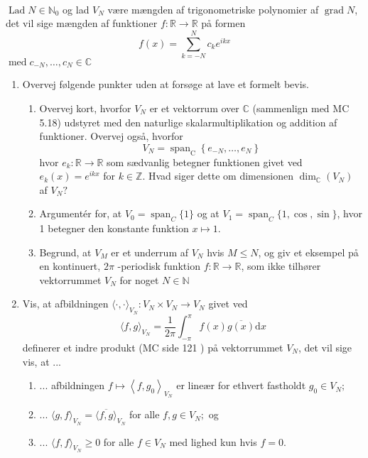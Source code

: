 \begin{itemize}
\begin{opg}[Vektorrumsstruktur]\hfill \\
	$\operatorname{Lad} N \in \mathbb{N}_{0}$ og lad $V_{N}$ være mængden af trigonometriske polynomier af $\operatorname{grad} N$, det vil sige mængden af funktioner $f: \mathbb{R} \rightarrow \mathbb{R}$ på formen
	$$
	f(x)=\sum_{k=-N}^{N} c_{k} e^{i k x}
	$$
	$\operatorname{med} c_{-N}, \ldots, c_{N} \in \mathbb{C}$
	\begin{enumerate}
	 \item Overvej følgende punkter uden at forsøge at lave et formelt bevis.
	 \begin{enumerate}[label=\roman*)]
	\item Overvej kort, hvorfor $V_{N}$ er et vektorrum over $\mathbb{C}$ (sammenlign med MC 5.18) udstyret med den naturlige skalarmultiplikation og addition af funktioner. Overvej også, hvorfor
	$$
	V_{N}=\operatorname{span}_{\mathrm{C}}\left\{e_{-N}, \ldots, e_{N}\right\}
	$$
	hvor $e_{k}: \mathbb{R} \rightarrow \mathbb{R}$ som sædvanlig betegner funktionen givet ved $e_{k}(x)=e^{i k x}$ for $k \in \mathbb{Z} .$ Hvad siger dette om dimensionen $\operatorname{dim}_{\mathbb{C}}\left(V_{N}\right)$ af $V_{N} ?$
	\item Argumentér for, at $V_{0}=\operatorname{span}_{C}\{1\}$ og at $V_{1}=\operatorname{span}_{C}\{1, \cos , \sin \}$, hvor 1 betegner den konstante funktion $x \mapsto 1$.
	\item Begrund, at $V_{M}$ er et underrum af $V_{N}$ hvis $M \leq N$, og giv et eksempel på en kontinuert, $2 \pi$ -periodisk funktion $f: \mathbb{R} \rightarrow \mathbb{R}$, som ikke tilhører vektorrummet $V_{N}$ for noget $N \in \mathbb{N}$
	\end{enumerate}
	\item Vis, at afbildningen $\langle\cdot, \cdot\rangle_{V_{N}}: V_{N} \times V_{N} \rightarrow V_{N}$ givet ved
	$$
	\langle f, g\rangle_{V_{N}}=\frac{1}{2 \pi} \int_{-\pi}^{\pi} f(x) \overline{g(x)} \mathrm{d} x
	$$
	definerer et indre produkt (MC side 121 ) på vektorrummet $V_{N}$, det vil sige vis, at ...
	\begin{enumerate}[label=\roman*)]
	\item ... afbildningen $f \mapsto\left\langle f, g_{0}\right\rangle_{V_{N}}$ er lineær for ethvert fastholdt $g_{0} \in V_{N} ;$
	\item ... $\langle g, f\rangle_{V_{N}}=\overline{\langle f, g\rangle}_{V_{N}}$ for alle $f, g \in V_{N} ;$ og
	\item ... $\langle f, f\rangle_{V_{N}} \geq 0$ for alle $f \in V_{N}$ med lighed kun hvis $f=0$.

\end{enumerate}
\end{enumerate}
\end{opg}
\end{itemize}
